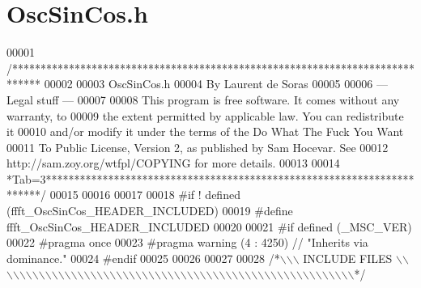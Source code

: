 \hypertarget{a00111_source}{\section{Osc\+Sin\+Cos.\+h}
\label{a00111_source}
}

\begin{DoxyCode}
00001 \textcolor{comment}{/*****************************************************************************}
00002 \textcolor{comment}{}
00003 \textcolor{comment}{        OscSinCos.h}
00004 \textcolor{comment}{        By Laurent de Soras}
00005 \textcolor{comment}{}
00006 \textcolor{comment}{--- Legal stuff ---}
00007 \textcolor{comment}{}
00008 \textcolor{comment}{This program is free software. It comes without any warranty, to}
00009 \textcolor{comment}{the extent permitted by applicable law. You can redistribute it}
00010 \textcolor{comment}{and/or modify it under the terms of the Do What The Fuck You Want}
00011 \textcolor{comment}{To Public License, Version 2, as published by Sam Hocevar. See}
00012 \textcolor{comment}{http://sam.zoy.org/wtfpl/COPYING for more details.}
00013 \textcolor{comment}{}
00014 \textcolor{comment}{*Tab=3***********************************************************************/}
00015 
00016 
00017 
00018 \textcolor{preprocessor}{#if ! defined (ffft\_OscSinCos\_HEADER\_INCLUDED)}
00019 \textcolor{preprocessor}{#define ffft\_OscSinCos\_HEADER\_INCLUDED}
00020 
00021 \textcolor{preprocessor}{#if defined (\_MSC\_VER)}
00022 \textcolor{preprocessor}{    #pragma once}
00023 \textcolor{preprocessor}{    #pragma warning (4 : 4250) // "Inherits via dominance."}
00024 \textcolor{preprocessor}{#endif}
00025 
00026 
00027 
00028 \textcolor{comment}{/*\(\backslash\)\(\backslash\)\(\backslash\) INCLUDE FILES \(\backslash\)\(\backslash\)\(\backslash\)\(\backslash\)\(\backslash\)\(\backslash\)\(\backslash\)\(\backslash\)\(\backslash\)\(\backslash\)\(\backslash\)\(\backslash\)\(\backslash\)\(\backslash\)\(\backslash\)\(\backslash\)\(\backslash\)\(\backslash\)\(\backslash\)\(\backslash\)\(\backslash\)\(\backslash\)\(\backslash\)\(\backslash\)\(\backslash\)\(\backslash\)\(\backslash\)\(\backslash\)\(\backslash\)\(\backslash\)\(\backslash\)\(\backslash\)\(\backslash\)\(\backslash\)\(\backslash\)\(\backslash\)\(\backslash\)\(\backslash\)\(\backslash\)\(\backslash\)\(\backslash\)\(\backslash\)\(\backslash\)\(\backslash\)\(\backslash\)\(\backslash\)\(\backslash\)\(\backslash\)\(\backslash\)\(\backslash\)\(\backslash\)\(\backslash\)\(\backslash\)\(\backslash\)\(\backslash\)\(\backslash\)*/}

\end{DoxyCode}
